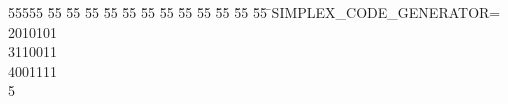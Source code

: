 %
%
\begin{tabbing}
55555 \= 55 \= 55 \= 55 \= 55 \= 55 \= 55 \= 55 \= 55 \= 55 \= 55 \= 55 \= 55 \= \>SIMPLEX\_CODE\_GENERATOR=\\[0pt]
2010101\ \\[0pt]
3110011\ \\[0pt]
4001111\\[0pt]
5\>\end{tabbing}
